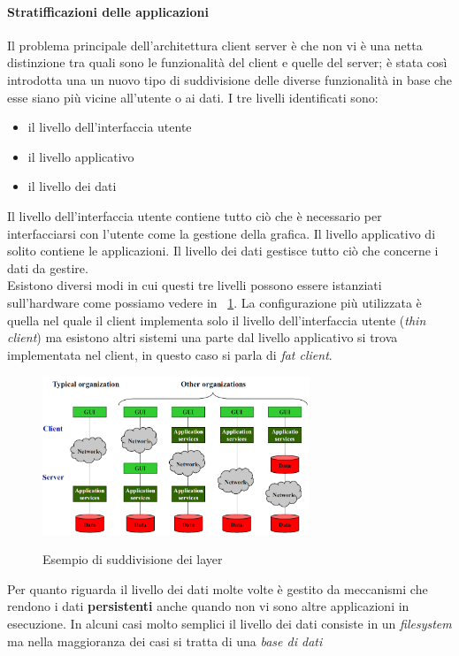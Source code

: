 \paragraph{Stratifficazioni delle applicazioni}
Il problema principale dell'architettura client server è che non vi è una netta distinzione tra quali sono le funzionalità del client e quelle del server; è stata così introdotta una un nuovo tipo di suddivisione delle diverse funzionalità in base che esse siano più vicine all'utente o ai dati. I tre livelli identificati sono:
\begin{itemize}
\item il livello dell'interfaccia utente
\item il livello applicativo
\item il livello dei dati
\end{itemize}
Il livello dell'interfaccia utente contiene tutto ciò che è necessario per interfacciarsi con l'utente come la gestione della grafica. Il livello applicativo di solito contiene le applicazioni. Il livello dei dati gestisce tutto ciò che concerne i dati da gestire.\\
Esistono diversi modi in cui questi tre livelli possono essere istanziati sull'hardware come possiamo vedere in \figurename~\ref{fig:layer}.
La configurazione più utilizzata è quella nel quale il client implementa solo il livello dell'interfaccia utente (\emph{thin client}) ma esistono altri sistemi una parte dal livello applicativo si trova implementata nel client, in questo caso si parla di \emph{fat client}.
\begin{figure}[htb]
\centering
\includegraphics[width=8cm]{img/layer.png}\\
\caption{Esempio di suddivisione dei layer}\label{fig:layer}
\end{figure}
Per quanto riguarda il livello dei dati molte volte è gestito da meccanismi che rendono i dati \textbf{persistenti} anche quando non vi sono altre applicazioni in esecuzione. In alcuni casi molto semplici il livello dei dati consiste in un  \emph{filesystem} ma nella maggioranza dei casi si tratta di una \emph{base di dati}

